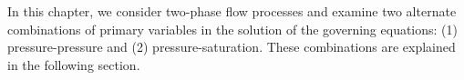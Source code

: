 
In this chapter, we consider two-phase flow processes and examine two alternate combinations of primary variables in the solution of the governing equations: (1) pressure-pressure and (2) pressure-saturation. These combinations are explained in the following section.




